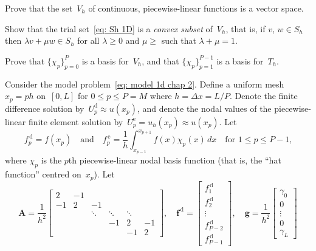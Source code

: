 \begin{Exercises}

\exercise\label{ex: V_h vector space}
Prove that the set~$V_h$ of continuous, piecewise-linear functions is a vector 
space.

\exercise
Show that the trial set~\eqref{eq: Sh 1D} is a \emph{convex subset} of~$V_h$,
that is, if $v$, $w\in S_h$ then $\lambda v+\mu w\in S_h$ for all $\lambda\ge0$
and $\mu\ge$ such that $\lambda+\mu=1$.

\exercise
Prove that $\{\chi_p\}_{p=0}^P$ is a basis for~$V_h$, and that 
$\{\chi_p\}_{p=1}^{P-1}$ is a basis for~$T_h$.

\exercise
Consider the model problem~\eqref{eq: model 1d chap 2}.  Define a uniform 
mesh~$x_p=ph$ on~$[0,L]$ for $0\le p\le P=M$ where $h=\Delta x=L/P$.  Denote 
the finite difference solution by~$U^{\mathrm{d}}_p\approx u(x_p)$, and denote 
the nodal values of the piecewise-linear finite element solution 
by~$U^{\mathrm{e}}_p=u_h(x_p)\approx u(x_p)$.  Let 
\[
f^{\,\mathrm{d}}_p=f(x_p)\quad\text{and}\quad
f^{\,\mathrm{e}}_p=\frac{1}{h}\int_{x_{p-1}}^{x_{p+1}}f(x)\chi_p(x)\,dx
\quad\text{for $1\le p\le P-1$,}
\]
where $\chi_p$ is the $p$th piecewise-linear nodal basis function (that is, the 
``hat function'' centred on~$x_p$).  Let
\[
\boldsymbol{A}=\frac{1}{h^2}\begin{bmatrix}
 2&-1&      &      &      &\\
-1& 2&    -1&      &      &\\
  &  &\ddots&\ddots&\ddots&\\
  &  &      &    -1&     2&-1\\
  &  &      &      &    -1& 2
\end{bmatrix},\quad
\boldsymbol{f}^{\,\mathrm{d}}=\begin{bmatrix}
f^{\,\mathrm{d}}_1\\                              
f^{\,\mathrm{d}}_2\\                              
\vdots\\
f^{\,\mathrm{d}}_{P-2}\\                              
f^{\,\mathrm{d}}_{P-1}                              
\end{bmatrix},\quad
\boldsymbol{g}=\frac{1}{h^2}\begin{bmatrix}
\gamma_0\\ 0\\ \vdots\\ 0\\ \gamma_L                            

\end{bmatrix}\]
\end{Exercises}
